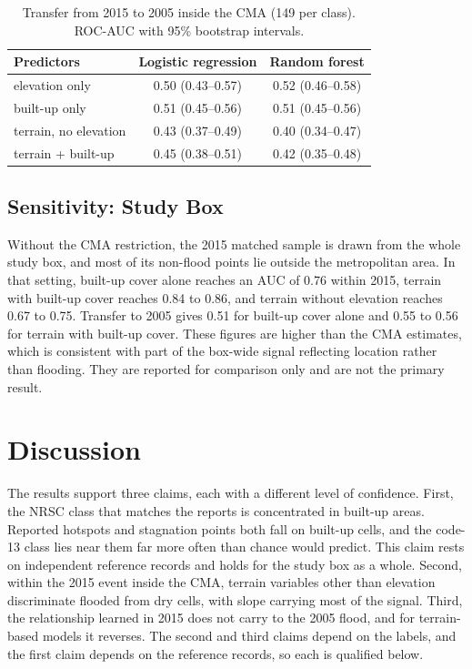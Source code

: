 \documentclass[conference]{IEEEtran}
\begin{document}
\begin{table}[h]
\centering
\caption{Transfer from 2015 to 2005 inside the CMA (149 per class). ROC-AUC with 95\% bootstrap intervals.}
\label{tab:transfer}
\begin{tabular}{lcc}
\toprule
Predictors & Logistic regression & Random forest \\
\midrule
elevation only & 0.50 (0.43--0.57) & 0.52 (0.46--0.58) \\
built-up only & 0.51 (0.45--0.56) & 0.51 (0.45--0.56) \\
terrain, no elevation & 0.43 (0.37--0.49) & 0.40 (0.34--0.47) \\
terrain + built-up & 0.45 (0.38--0.51) & 0.42 (0.35--0.48) \\
\bottomrule
\end{tabular}
\end{table}

\subsection{Sensitivity: Study Box}
Without the CMA restriction, the 2015 matched sample is drawn from the whole study box, and most of its non-flood points lie outside the metropolitan area. In that setting, built-up cover alone reaches an AUC of 0.76 within 2015, terrain with built-up cover reaches 0.84 to 0.86, and terrain without elevation reaches 0.67 to 0.75. Transfer to 2005 gives 0.51 for built-up cover alone and 0.55 to 0.56 for terrain with built-up cover. These figures are higher than the CMA estimates, which is consistent with part of the box-wide signal reflecting location rather than flooding. They are reported for comparison only and are not the primary result.

\section{Discussion}\label{sec:discussion}

The results support three claims, each with a different level of confidence. First, the NRSC class that matches the reports is concentrated in built-up areas. Reported hotspots and stagnation points both fall on built-up cells, and the code-13 class lies near them far more often than chance would predict. This claim rests on independent reference records and holds for the study box as a whole. Second, within the 2015 event inside the CMA, terrain variables other than elevation discriminate flooded from dry cells, with slope carrying most of the signal. Third, the relationship learned in 2015 does not carry to the 2005 flood, and for terrain-based models it reverses. The second and third claims depend on the labels, and the first claim depends on the reference records, so each is qualified below.
\end{document}
